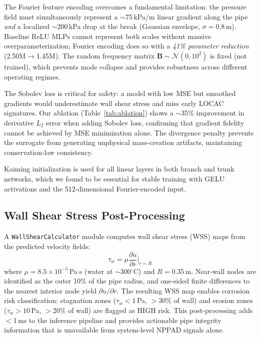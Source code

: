 \documentclass[conference]{IEEEtran}
\begin{document}
The Fourier feature encoding overcomes a fundamental limitation: the pressure field must simultaneously represent a $\sim$75\,kPa/m linear gradient along the pipe \emph{and} a localized $\sim$200\,kPa drop at the break (Gaussian envelope, $\sigma = 0.8$\,m). Baseline ReLU MLPs cannot represent both scales without massive overparameterization; Fourier encoding does so with a \emph{41\% parameter reduction} (2.50M$\to$1.45M). The random frequency matrix $\bm{B} \sim \mathcal{N}(0, 10^2)$ is fixed (not trained), which prevents mode collapse and provides robustness across different operating regimes.

The Sobolev loss is critical for safety: a model with low MSE but smoothed gradients would underestimate wall shear stress and miss early LOCAC signatures. Our ablation (Table~\ref{tab:ablation}) shows a $\sim$35\% improvement in derivative $L_2$ error when adding Sobolev loss, confirming that gradient fidelity cannot be achieved by MSE minimization alone. The divergence penalty prevents the surrogate from generating unphysical mass-creation artifacts, maintaining conservation-law consistency.

Kaiming initialization \cite{he2015init} is used for all linear layers in both branch and trunk networks, which we found to be essential for stable training with GELU activations and the 512-dimensional Fourier-encoded input.

\subsection{Wall Shear Stress Post-Processing}

A \texttt{WallShearCalculator} module computes wall shear stress (WSS) maps from the predicted velocity fields:
\begin{equation}
\tau_w = \mu \frac{\partial u}{\partial r}\bigg|_{r=R}
\label{eq:wss}
\end{equation}
where $\mu = 8.5 \times 10^{-5}$\,Pa$\cdot$s (water at $\sim$300$^\circ$C) and $R = 0.35$\,m. Near-wall nodes are identified as the outer 10\% of the pipe radius, and one-sided finite differences to the nearest interior node yield $\partial u/\partial r$. The resulting WSS map enables corrosion risk classification: stagnation zones ($\tau_w < 1$\,Pa, $>$30\% of wall) and erosion zones ($\tau_w > 10$\,Pa, $>$20\% of wall) are flagged as HIGH risk. This post-processing adds $<$1\,ms to the inference pipeline and provides actionable pipe integrity information that is unavailable from system-level NPPAD signals alone.
\end{document}
